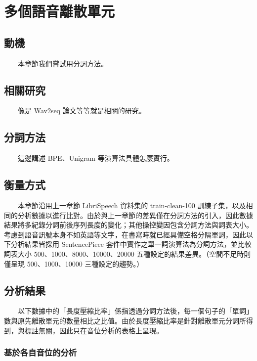 
\chapter{多個語音離散單元}

{  
{  
\section{動機}
　　本章節我們嘗試用分詞方法。

\section{相關研究} 
　　像是 Wav2seq \cite{wu_wav2seq_2023}  論文等等就是相關的研究。

\section{分詞方法}
　　這邊講述 BPE、Unigram 等演算法具體怎麼實行。
        \newcommand{\jefftablesep}{\vspace{0.5cm}}
        \renewcommand{\arraystretch}{0.7} %
}

\section{衡量方式}
　　本章節沿用上一章節 LibriSpeech 資料集的 train-clean-100 訓練子集，以及相同的分析數據以進行比對。由於與上一章節的差異僅在分詞方法的引入，因此數據結果將多紀錄分詞前後序列長度的變化；其他操控變因包含分詞方法與詞表大小。考慮到語音訊號本身不如英語等文字，在書寫時就已經具備空格分隔單詞，因此以下分析結果皆採用 SentencePiece 套件中實作之單一詞演算法為分詞方法，並比較詞表大小 500、1000、8000、10000、20000 五種設定的結果差異。（空間不足時則僅呈現 500、1000、10000 三種設定的趨勢。）
}

\section{分析結果} 

　　以下數據中的「長度壓縮比率」係指透過分詞方法後，每一個句子的「單詞」數與原先離散單元的數量相比之比值。由於長度壓縮比率是針對離散單元分詞所得到，與標註無關，因此只在音位分析的表格上呈現。

\subsection{基於各自音位的分析}

